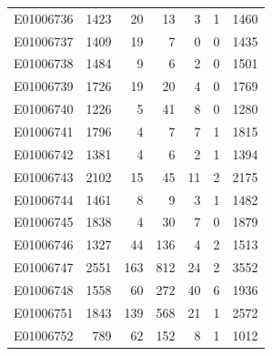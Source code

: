 \documentclass[
  letterpaper,
  DIV=11,
  numbers=noendperiod]{scrreprt}
\begin{document}
\begin{tabular}{lrrrrrr}
E01006736     &    1423 &      20 &                    13 &                               3 &                       1 &              1460 \\
E01006737     &    1409 &      19 &                     7 &                               0 &                       0 &              1435 \\
E01006738     &    1484 &       9 &                     6 &                               2 &                       0 &              1501 \\
E01006739     &    1726 &      19 &                    20 &                               4 &                       0 &              1769 \\
E01006740     &    1226 &       5 &                    41 &                               8 &                       0 &              1280 \\
E01006741     &    1796 &       4 &                     7 &                               7 &                       1 &              1815 \\
E01006742     &    1381 &       4 &                     6 &                               2 &                       1 &              1394 \\
E01006743     &    2102 &      15 &                    45 &                              11 &                       2 &              2175 \\
E01006744     &    1461 &       8 &                     9 &                               3 &                       1 &              1482 \\
E01006745     &    1838 &       4 &                    30 &                               7 &                       0 &              1879 \\
E01006746     &    1327 &      44 &                   136 &                               4 &                       2 &              1513 \\
E01006747     &    2551 &     163 &                   812 &                              24 &                       2 &              3552 \\
E01006748     &    1558 &      60 &                   272 &                              40 &                       6 &              1936 \\
E01006751     &    1843 &     139 &                   568 &                              21 &                       1 &              2572 \\
E01006752     &     789 &      62 &                   152 &                               8 &                       1 &              1012 \\

\end{tabular}
\end{document}
